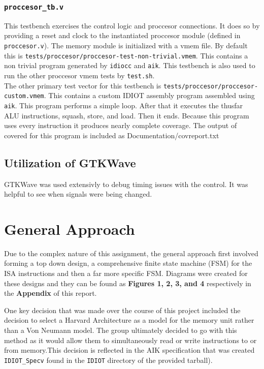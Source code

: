 \documentclass[conference]{IEEEtran}
\begin{document}
\subsubsection{\texttt{proccesor\_tb.v}}
This testbench exercises the control logic and proccesor connections. It does
so by providing a reset and clock to the instantiated proccesor module (defined
in \texttt{proccesor.v}). The memory module is initialized with a vmem file. By
default this is \texttt{tests/proccesor/proccesor-test-non-trivial.vmem}. This
contains a non trivial program generated by \texttt{idiocc} and \texttt{aik}. 
This testbench is also used to run the other proccesor vmem tests by 
\texttt{test.sh}. \\

The other primary test vector for this testbench is
\texttt{tests/proccesor/proccesor-custom.vmem}. This contains a custom IDIOT
assembly program assembled using \texttt{aik}. This program performs a simple
loop. After that it executes the thusfar ALU instructions, squash, store, and
load. Then it ends. Because this program uses every instruction it produces 
nearly complete coverage. The output of covered for this program is included
as Documentation/covreport.txt

\subsection{Utilization of GTKWave}
GTKWave was used extensivly to debug timing issues with the control. It was 
helpful to see when signals were being changed. 


\section{General Approach}
Due to the complex nature of this assignment, the general approach 
first involved forming a top down design, a comprehensive finite
state machine (FSM) for the ISA instructions and then a far more specific
FSM. Diagrams were created for these designs and they can be 
found as \textbf{Figures 1, 2, 3, and 4} respectively in the \textbf{Appendix} 
of this report. 

One key decision that was made over the course of this project included 
the decision to select a Harvard Architecture as a model for the memory unit
rather than a Von Neumann model. The group ultimately decided to go 
with this method as it would allow them to simultaneously read or write
instructions to or from memory.This decision is reflected in the AIK 
specification that was created \texttt{IDIOT\_Specv} found in the \texttt{IDIOT}
directory of the provided tarball).
\end{document}
